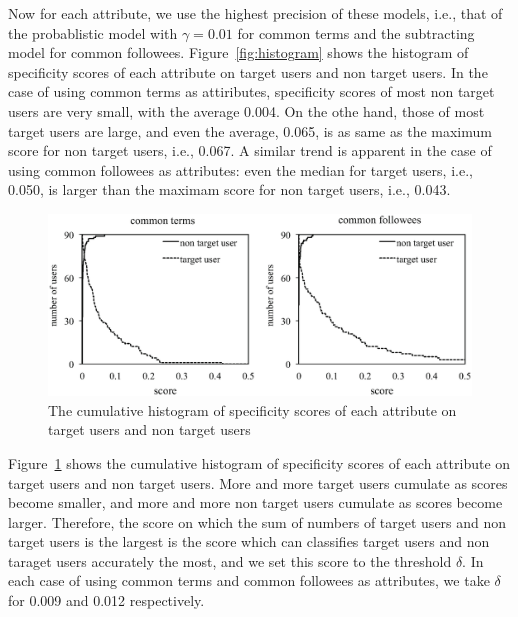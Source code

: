 Now for each attribute, we use the highest precision of these models,
i.e., that of the probablistic model with $\gamma=0.01$ for common terms
and the subtracting model for common
followees. Figure~\ref{fig:histogram} shows the histogram of specificity
scores of each attribute on target users and non target users.  In the
case of using common terms as attiributes, specificity scores of most
non target users are very small, with the average 0.004.  On the othe
hand, those of most target users are large, and even the average, 0.065,
is as same as the maximum score for non target users, i.e., 0.067.  A
similar trend is apparent in the case of using common followees as
attributes: even the median for target users, i.e., 0.050, is larger
than the maximam score for non target users, i.e., 0.043.

{\footnotesize
\begin{figure}[t]
\begin{center}
\includegraphics[width=14cm]{images/cumulativehistogram.eps}
 \caption{The cumulative histogram of specificity scores of each
 attribute on target users and non target users}
\label{fig:cumulativehistogram}
\end{center}
\end{figure}
}

Figure~\ref{fig:cumulativehistogram} shows the cumulative histogram of
specificity scores of each attribute on target users and non target
users.  More and more target users cumulate as scores become smaller,
and more and more non target users cumulate as scores become larger.
Therefore, the score on which the sum of numbers of target users and non
target users is the largest is the score which can classifies target
users and non taraget users accurately the most, and we set this score
to the threshold $\delta$.  In each case of using common terms and
common followees as attributes, we take $\delta$ for 0.009 and 0.012
respectively.

